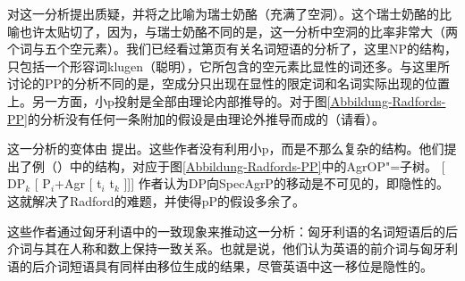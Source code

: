  \citet[--550]{Sternefeld2006a-u}对这一分析提出质疑，并将之比喻为瑞士奶酪（充满了空洞）。这个瑞士奶酪的比喻也许太贴切了，因为，与瑞士奶酪不同的是，这一分析中空洞的比率非常大（两个词与五个空元素）。我们已经看过第\pageref{Abbildung-NP-ohne-Det}页有关名词短语的分析了，这里NP的结构，只包括一个形容词klugen（聪明），它所包含的空元素比显性的词还多。与这里所讨论的PP的分析不同的是，空成分只出现在显性的限定词和名词实际出现的位置上。另一方面，小p投射是全部由理论内部推导的。对于图\ref{Abbildung-Radfords-PP}的分析没有任何一条附加的假设是由理论外推导而成的（请看\citealp[--550]{Sternefeld2006a-u}）。

这一分析的变体由 \citet*[]{HNG2005a}提出。这些作者没有利用小p，而是不那么复杂的结构。他们提出了例（）中的结构，对应于图\ref{Abbildung-Radfords-PP}中的AgrOP"=子树。
\ea
{}[ DP$_k$ [ P$_i$+Agr [ t$_i$ t$_k$ ]]]
\z
作者认为DP向SpecAgrP的移动是不可见的，即隐性的。这就解决了Radford的难题，并使得pP的假设多余了。

这些作者通过匈牙利语中的一致现象来推动这一分析：匈牙利语的名词短语后的后介词与其在人称和数上保持一致关系。也就是说，他们认为英语的前介词与匈牙利语的后介词短语具有同样由移位生成的结果，尽管英语中这一移位是隐性的。

